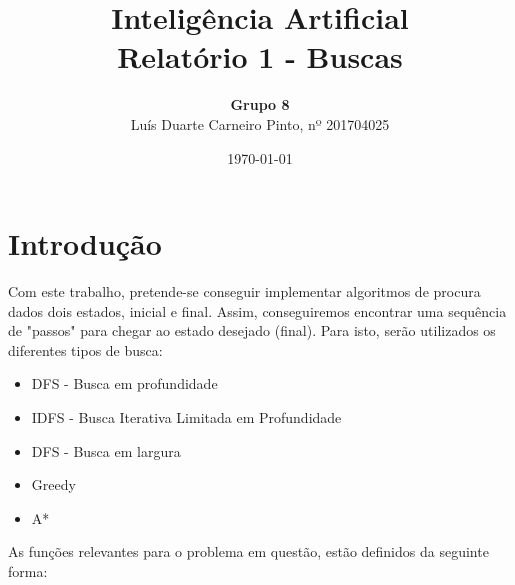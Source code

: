 \documentclass{article}
\title{\textbf{Inteligência Artificial\\Relatório 1 - Buscas}}
\author{\textbf{Grupo 8}\\[4mm]Luís Duarte Carneiro Pinto, nº 201704025}
\date{\today}
\begin{document}
\maketitle
\newpage
\tableofcontents
\clearpage
\pagestyle{fancy}
\fancyhf{}
\setlength{\headheight}{30pt}
\setlength{\footskip}{15pt}
\rfoot{\thepage}
\section{Introdução}
\hspace{10mm}Com este trabalho, pretende-se conseguir implementar algoritmos de procura dados dois estados, inicial e final. Assim, conseguiremos encontrar uma sequência de "passos" para chegar ao estado desejado (final). Para isto, serão utilizados os diferentes tipos de busca:
\begin{itemize}
  \item[\textbullet]{DFS - Busca em profundidade}
  \item[\textbullet]{IDFS - Busca Iterativa Limitada em Profundidade}
  \item[\textbullet]{DFS - Busca em largura}
  \item[\textbullet]{Greedy}
  \item[\textbullet]{A*}
\end{itemize}
As funções relevantes para o problema em questão, estão definidos da seguinte forma:
\end{document}
